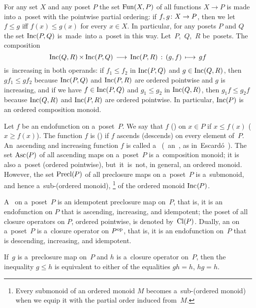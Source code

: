 \documentclass[11pt,letterpaper]{article}
\begin{document}
For any set $X$ and any poset $P$ the set $\mathop{\smash{\mathrm{Fun}}}\nolimits(X,P)$ of all functions $X\to P$
	is made into a~poset with the pointwise partial ordering:
if $f,\mspace{1mu} g\colon X\to P$, then we let $f\leq g$ iff $f(x)\leq g(x)$ for every $x\in X$.
In particular, for any posets $P$ and $Q$ the set $\mathop{\smash{\mathrm{Inc}}}\nolimits(P,Q)$ is~made~into a~poset in this way.
Let~$P$,~$Q$,~$R$ be~posets.
The composition
%
\begin{equation*}
\mathop{\smash{\mathrm{Inc}}}\nolimits(Q,R)\mspace{-1mu}\times\mspace{-1mu}\mathop{\smash{\mathrm{Inc}}}\nolimits(P,Q) \,\longrightarrow\, \mathop{\smash{\mathrm{Inc}}}\nolimits(P,R) \,:\, (g,f) \,\longmapsto\, gf
\end{equation*}
%
is~increasing in both operands:
if $f_1\leq f_2$ in $\mathop{\smash{\mathrm{Inc}}}\nolimits(P,Q)$ and $g\in\mathop{\smash{\mathrm{Inc}}}\nolimits(Q,R)\mspace{1mu}$,
	then $gf_1\leq gf_2$
	because $\mathop{\smash{\mathrm{Inc}}}\nolimits(P,Q)$ and $\mathop{\smash{\mathrm{Inc}}}\nolimits(P,R)$ are ordered pointwise and $g$ is increasing,
and if we have $f\in\mathop{\smash{\mathrm{Inc}}}\nolimits(P,Q)$ and $g_1\leq g_2$ in $\mathop{\smash{\mathrm{Inc}}}\nolimits(Q,R)$,
	then $g_1f\leq g_2f$
	because $\mathop{\smash{\mathrm{Inc}}}\nolimits(Q,R)$ and $\mathop{\smash{\mathrm{Inc}}}\nolimits(P,R)$ are ordered pointwise.
In particular, $\mathop{\smash{\mathrm{Inc}}}\nolimits(\mspace{-1mu} P)$ is an ordered composition monoid.

\txtskip

Let $f$ be an endofunction on a~poset~$P$.
We say that $f$  () on $x\in P$
	if $x\leq f(x)$ {\large(}$x\geq f(x)${\large)}.
The function $f$ is  ()
	if $f$ ascends (descends) on every element of~$P$.
An~ascending and increasing function $f$ is called a~
	(\aka\ an~, as in~Escard\'o~\cite{escardo}).
The set $\mathop{\smash{\mathrm{Asc}}}\nolimits\mspace{1mu}(\mspace{-1mu} P)$ of all ascending maps on a~poset~$P$ is a~composition monoid;
it is also a~poset (ordered pointwise),
	but~it~is~not, in general, an ordered monoid.
However, the set $\mathop{\smash{\mathrm{Precl}}}\nolimits(\mspace{-1mu} P)$ of all preclosure maps on a~poset~$P$
is a~submonoid, and hence a~sub-(ordered monoid),%
%
\footnote{Every submonoid of an ordered monoid $M$ becomes a~sub-(ordered monoid)
when we equip it with the partial order induced from~$M$.}
%
of the ordered monoid $\mathop{\smash{\mathrm{Inc}}}\nolimits\mspace{1mu}(\mspace{-1mu} P)$.

A~ on a~poset~$P$ is an idempotent preclosure map on~$P$,
that is, it is an endofunction on $P$ that is ascending, increasing, and idempotent;
the poset of all closure operators on $P$, ordered pointwise, is denoted by~$\mathop{\smash{\mathrm{Cl}}}\nolimits(\mspace{-1mu} P)$.
Dually, an  on a~poset~$P$ is a~closure operator on $P^{\mspace{1mu}\mathrm{op}}$,
that is, it is an endofunction on~$P$ that is descending, increasing, and idempotent.

If~$g$ is a~preclosure map on~$P$ and $h$ is a~closure operator on~$P$,
then the inequality $g\leq h$ is equivalent to
	either of the equalities $gh = h$, $hg = h$.
\end{document}
